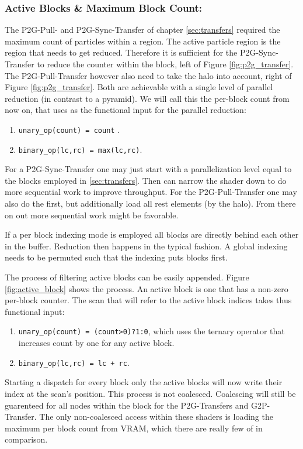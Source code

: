 \documentclass[m,times]{cgMA}
\begin{document}
\subsubsection{Active Blocks \& Maximum Block Count:}\label{sec:active_blocks}
The P2G-Pull- and P2G-Sync-Transfer of chapter \ref{sec:transfers} required the maximum count of particles within a region. The active particle region is the region that needs to get reduced. Therefore it is sufficient for the P2G-Sync-Transfer to reduce the counter within the block, left of Figure \ref{fig:p2g_transfer}. The P2G-Pull-Transfer however also need to take the halo into account, right of Figure \ref{fig:p2g_transfer}. Both are achievable with a single level of parallel reduction (in contrast to a pyramid). We will call this the per-block count from now on, that uses as the functional input for the parallel reduction:
\begin{enumerate}
  \item \texttt{unary\_op(count) = count} .
  \item \texttt{binary\_op(lc,rc) = max(lc,rc)}.
\end{enumerate}

For a P2G-Sync-Transfer one may just start with a parallelization level equal to the blocks employed in \ref{sec:transfers}. Then can narrow the shader down to do more sequential work to improve throughput. For the P2G-Pull-Transfer one may also do the first, but additionally load all rest elements (by the halo). From there on out more sequential work might be favorable.

If a per block indexing mode is employed all blocks are directly behind each other in the buffer. Reduction then happens in the typical fashion. A global indexing needs to be permuted such that the indexing puts blocks first.

The process of filtering active blocks can be easily appended. Figure \ref{fig:active_block} shows the process. An active block is one that has a non-zero per-block counter. The scan that will refer to the active block indices takes thus functional input:
\begin{enumerate}
  \item \texttt{unary\_op(count) = (count>0)?1:0}, which uses the ternary operator that increases count by one for any active block.
  \item \texttt{binary\_op(lc,rc) = lc + rc}.
\end{enumerate}

Starting a dispatch for every block only the active blocks will now write their index at the scan's position. This process is not coalesced. Coalescing will still be guarenteed for all nodes within the block for the P2G-Transfers and G2P-Transfer. The only non-coalesced access within these shaders is loading the maximum per block count from VRAM, which there are really few of in comparison.
\end{document}
